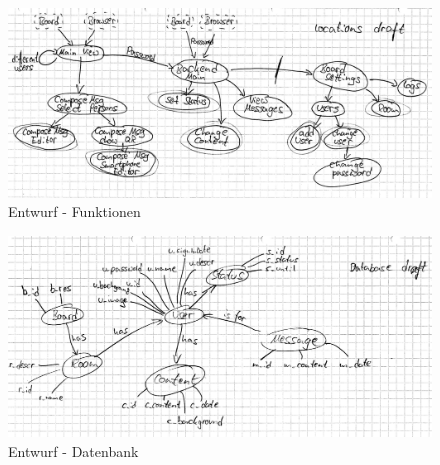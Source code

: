 \begin{figure}[h!]
  \centering
    \includegraphics[width=1\textwidth]{./img/draftLocations.png}
  \caption{Entwurf - Funktionen}
  \label{img:anhangFunktionen}
\end{figure}
\newpage
\begin{figure}[h!]
  \centering
    \includegraphics[width=1\textwidth]{./img/draftDatabase.png}
  \caption{Entwurf - Datenbank}
  \label{img:anhangDatenbank}
\end{figure}
\newpage
\begin{figure}[h!]
  \centering
    
  \label{img:handbuch1}
\end{figure}
\newpage
\begin{figure}[h!]
  \centering
    
  \label{img:handbuch2}
\end{figure}
\newpage
\begin{figure}[h!]
  \centering
    
  \label{img:handbuch3}
\end{figure}
\newpage
\begin{figure}[h!]
  \centering
    
  \label{img:handbuch4}
\end{figure}

